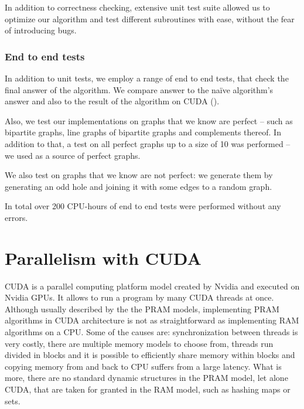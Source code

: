 In addition to correctness checking, extensive unit test suite allowed us to optimize our algorithm and test different subroutines with ease, without the fear of introducing bugs.

\subsubsection{End to end tests}

In addition to unit tests, we employ a range of end to end tests, that check the final answer of the algorithm. We compare answer to the na\"ive algorithm's answer and also to the result of the algorithm on CUDA ().

Also, we test our implementations on graphs that we know are perfect -- such as bipartite graphs, line graphs of bipartite graphs and complements thereof. In addition to that, a test on all perfect graphs up to a size of 10 was performed -- we used \cite{graphRepo} as a source of perfect graphs.

We also test on graphs that we know are not perfect: we generate them by generating an odd hole and joining it with some edges to a random graph.

In total over 200 CPU-hours of end to end tests were performed without any errors.

\section{Parallelism with CUDA}
\label{sec:CUDA}

CUDA is a parallel computing platform model created by Nvidia and executed on Nvidia GPUs. It allows to run a program  by many CUDA threads at once. Although usually described by the the PRAM models, implementing PRAM algorithms in CUDA architecture is not as straightforward as implementing RAM algorithms on a CPU. Some of the causes are: synchronization between threads is very costly, there are multiple memory models to choose from, threads run divided in blocks and it is possible to efficiently share memory within blocks and copying memory from and back to CPU suffers from a large latency. What is more, there are no standard dynamic structures in the PRAM model, let alone CUDA, that are taken for granted in the RAM model, such as hashing maps or sets. 


